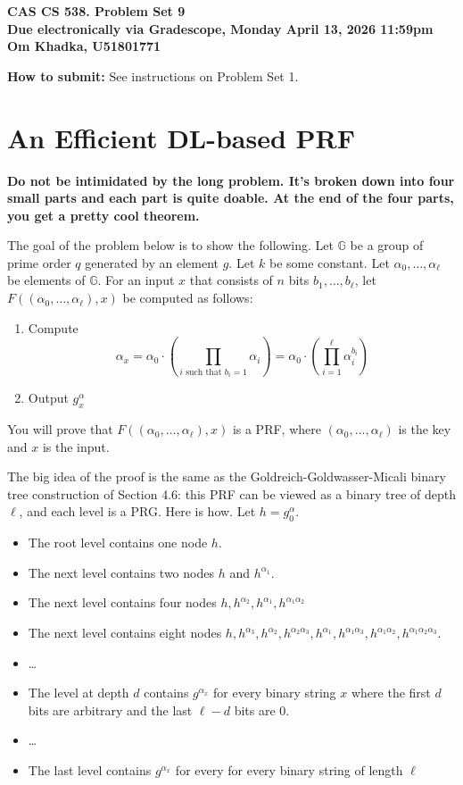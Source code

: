 \documentclass[12pt]{article}
\newif\ifsol
\theoremstyle{definition}
\newcommand{\G}{\mathbb{G}}
\begin{document}
\begin{center}
\Large{\textbf{CAS CS 538.  \ifsol Solutions to \fi Problem Set 9}}\\
\smallskip
\large{\textbf{Due electronically via Gradescope, Monday April 13, 2026 11:59pm}}\\
\large\textbf{Om Khadka, U51801771}
\end{center}

\noindent
\textbf{How to submit:}  See instructions on Problem Set 1. 
 
\section*{An Efficient DL-based PRF}

\textbf{Do not be intimidated by the long problem. It's broken down into four small parts and each part is quite doable. At the end of the four parts, you get a pretty cool theorem.}


The goal of the problem below is to show the following. Let $\G$ be a group of prime order $q$ generated by an element $g$. Let $k$ be some constant. Let $\alpha_0, \dots, \alpha_\ell$ be elements of $\G$. For an input $x$ that consists of $n$ bits $b_1, \dots, b_\ell$, let $F((\alpha_0, \dots, \alpha_\ell), x)$ be computed as follows:
\begin{enumerate}
\item Compute \[\alpha_x=\alpha_0 \cdot \left(\prod_{i \mbox{ such that }b_i = 1} \alpha_i \right)= \alpha_0 \cdot\left( \prod_{i =1}^\ell \alpha_i^{b_i}\right)\]
\item Output $g^\alpha_x$
\end{enumerate}

You will prove that $F((\alpha_0, \dots, \alpha_\ell), x)$ is a PRF, where $(\alpha_0, \dots, \alpha_\ell)$ is the key and $x$ is the input.

The big idea of the proof is the same as the Goldreich-Goldwasser-Micali binary tree construction of Section 4.6: this PRF can be viewed as a binary tree of depth $\ell$, and each level is a PRG. Here is how. Let $h=g^\alpha_0$.

\begin{itemize}
\item The root level contains one node $h$. 
\item The next level contains two nodes $h$ and $h^{\alpha_1}$. 
\item The next level contains four nodes $h, h^{\alpha_2}, h^{\alpha_1}, h^{\alpha_1\alpha_2}$
\item The next level contains eight nodes $h, h^{\alpha_3}, h^{\alpha_2}, h^{\alpha_2\alpha_3}, h^{ \alpha_1},h^{\alpha_1\alpha_3}, h^{\alpha_1\alpha_2},h^{\alpha_1\alpha_2\alpha_3}$.
\item \dots
\item The level at depth $d$ contains $g^{\alpha_x}$ for every binary string $x$ where the first $d$ bits are arbitrary and the last $\ell-d$ bits are 0.
\item\dots
\item The last level contains $g^{\alpha_x}$ for every for every binary string of length $\ell$
\end{itemize}
\end{document}
